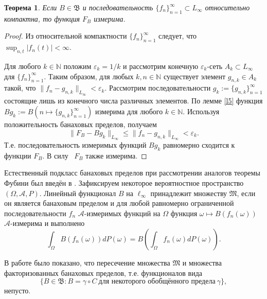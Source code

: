 \documentclass[12pt]{article}
\newtheorem{thm}{Теорема}
\def\N{{\mathbb{N}}}
\def\B{{\mathfrak{B}}}
\begin{document}
\begin{thm}\label{l6}
Если $B\in \B$ и последовательность $\{f_n\}_{n=1}^\infty \subset L_\infty$  относительно компактна, то функция $F_B$ измерима.
\end{thm}

\begin{proof}
Из относительной компактности $\{f_n\}_{n=1}^\infty$ следует,
что $\sup_{n,t} |f_n(t)| < \infty$.

Для любого $k\in\N$ положим $\varepsilon_k=1/k$
и рассмотрим конечную $\varepsilon_k$-сеть $A_k\subset L_\infty$ для $\{f_n\}_{n=1}^\infty$.
Таким образом, для любых $k, n\in\N$ существует элемент $g_{n,k}\in A_k$ такой,
что $\|f_n-g_{n,k}\|_{L_\infty}<\varepsilon_k$.
Рассмотрим последовательности $g_k:=\{g_{n,k}\}_{n=1}^\infty$ состоящие лишь из конечного числа различных  элементов. По лемме \ref{l5} функция $Bg_k:= B(n\mapsto \{g_{n,k}\}_{n=1}^\infty)$ измерима для любого $k\in \N.$ Используя положительность банаховых пределов, получаем
$$\|F_B-Bg_{k}\|_{L_\infty}\leqslant\|f_n-g_{n,k}\|_{L_\infty}<\varepsilon_k.$$
Т.е. последовательность измеримых функций $Bg_k$ равномерно сходится к функции $F_B$. В силу~\cite[Теорема 4.2.2]{NatansonTF} $F_B$ также измерима.
\end{proof}

Естественный подкласс банаховых пределов при рассмотрении аналогов теоремы Фубини был введён в \cite{Mokobodzki}.
Зафиксируем некоторое вероятностное пространство $(\Omega, \mathcal A, P)$. Линейный функционал $B$ на $\ell_\infty$ принадлежит множеству $\mathfrak M$, если он является банаховым пределом и для любой равномерно ограниченной последовательности $f_n$  $\mathcal A$-измеримых функций на $\Omega$ функция $\omega \mapsto B(f_n(\omega))$ $\mathcal A$-измерима и выполнено
\begin{equation}\label{Fubini1}
\int_\Omega B(f_n(\omega)) dP(\omega) = B\left(\int_\Omega f_n(\omega) dP(\omega)\right).
 \end{equation}

 В работе \cite{Bjorklund} было показано, что пересечение множества $\mathfrak M$ и множества факторизованных банаховых пределов, т.е. функционалов вида
$$\{ B\in \B : B=\gamma \circ C \ \text{для некоторого обобщённого предела} \ \gamma\},$$
непусто.

%


\printbibliography
\end{document}
